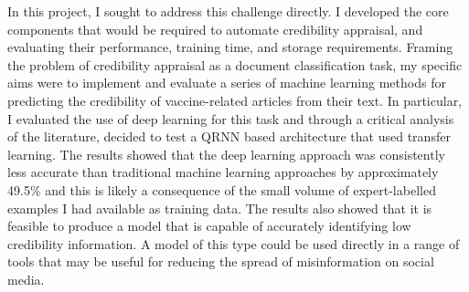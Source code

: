 \documentclass[a4paper,twoside,phd]{BYUPhys}
\begin{document}
In this project, I sought to address this challenge directly. I developed the core components that would be required to automate credibility appraisal, and evaluating their performance, training time, and storage requirements. Framing the problem of credibility appraisal as a document classification task, my specific aims were to implement and evaluate a series of machine learning methods for predicting the credibility of vaccine-related articles from their text. In particular, I evaluated the use of deep learning for this task and through a critical analysis of the literature, decided to test a QRNN based architecture that used transfer learning. The results showed that the deep learning approach was consistently less accurate than traditional machine learning approaches by approximately 49.5\%  and this is likely a consequence of the small volume of expert-labelled examples I had available as training data. The results also showed that it is feasible to produce a model that is capable of accurately identifying low credibility information. A model of this type could be used directly in a range of tools that may be useful for reducing the spread of misinformation on social media.

\clearemptydoublepage




%

%

%
\end{document}
